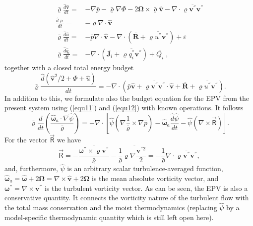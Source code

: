 \begin{align}
\bar{\varrho}\frac{\hat{d}\hat{\mathbf{v}}}{dt}=&-\nabla\bar{p}-\bar{\varrho}\nabla\Phi -2\mathbf{\Omega}\times\bar{\varrho}\hat{\mathbf{v}}-\nabla\cdot
\overline{\varrho \mathbf{v}^{''}\mathbf{v}^{''}}
\label{equ11}\\
\frac{\hat{d}\bar{\varrho}}{dt}=& -\bar{\varrho} \nabla\cdot \hat{\mathbf{v}} \label{equ12}\\
\bar{\varrho}\frac{\hat{d}\hat{u}}{dt}=& -\bar{p} \nabla\cdot \hat{\mathbf{v}}
-\nabla\cdot( \overline{\mathbf{R}}+\overline{\varrho u^{''}\mathbf{v}^{''}})
+ \varepsilon \label{equ13}\\
\bar{\varrho}\frac{\hat{d}\hat{q}_{i}}{dt}=&
-\nabla\cdot( \overline{\mathbf{J}_i} + \overline{\varrho q_{i}^{''}\mathbf{v}^{''}}) + \overline{Q_{i}}\;,
\label{equ14}
\end{align} 
together with a closed total energy budget
\begin{displaymath}
\bar{\varrho}\frac{\hat{d}\!\left( \hat{\mathbf{v}}^2\!/2\!+\! \Phi \!+ \!\hat{u}\right)}{dt} =-\!\nabla \!\cdot\!(  \bar{p}\hat{\mathbf{v}}+ \overline{\varrho \mathbf{v}^{''}\mathbf{v}^{''}} \!\cdot\! \hat{\mathbf{v}}+\overline{\mathbf{R}}+\overline{\varrho u^{''}\mathbf{v}^{''}}).
\end{displaymath}
In addition to this, we formulate also the budget equation for the EPV from the present system using (\ref{equ11}) and  (\ref{equ12}) with known operations. It follows
\begin{equation}
\bar{\varrho}\frac{\hat{d}}{dt}\left( \frac{\hat{\boldsymbol{\omega}}_a\cdot \nabla \hat{\psi} }{\bar{\varrho}}\right)=
-\nabla \cdot \left[\hat{\psi}\left(\nabla \frac{1}{\bar{\varrho}}\times\nabla
\bar{p}\right)-\hat{\boldsymbol{\omega}}_a \frac{\hat{d}\hat{\psi }}{d t}-\hat{\psi }
\left(\nabla \times \vec{\mathsf{R}} \right)\right].\label{equ16}
\end{equation}
For the vector $\vec{\mathsf{R}}$ we have
\begin{equation}
\vec{\mathsf{R}}=-\frac{\overline{\boldsymbol{\omega}^{''}\times \varrho \mathbf{v}^{''}}}{\bar{\varrho}}-\frac{1}{\bar{\varrho}}\overline{\varrho \nabla \frac{\mathbf{v}^{'' 2}}{2}} = -\frac{1}{\bar{\varrho}}
\nabla \cdot \overline{ \varrho \mathbf{v}^{''}\mathbf{v}^{''} },\label{equ17}
\end{equation} 
and, furthermore, $\hat{\psi}$ is an arbitrary scalar turbulence-averaged function, $\hat{\boldsymbol{\omega}}_a= \hat{\boldsymbol{\omega}}+2 \mathbf{\Omega}= \nabla\times \hat{\mathbf{v}}+2\mathbf{\Omega}$ is the mean absolute vorticity vector, and $\boldsymbol{\omega}^{''}= \nabla\times\mathbf{v}^{''} $ is the turbulent vorticity vector. As can be seen, the EPV is also a conservative quantity. It connects the vorticity nature of the turbulent flow with the total mass conservation and the moist thermodynamics (replacing $\hat{\psi}$ by a model-specific thermodynamic quantity which is still left open here).

